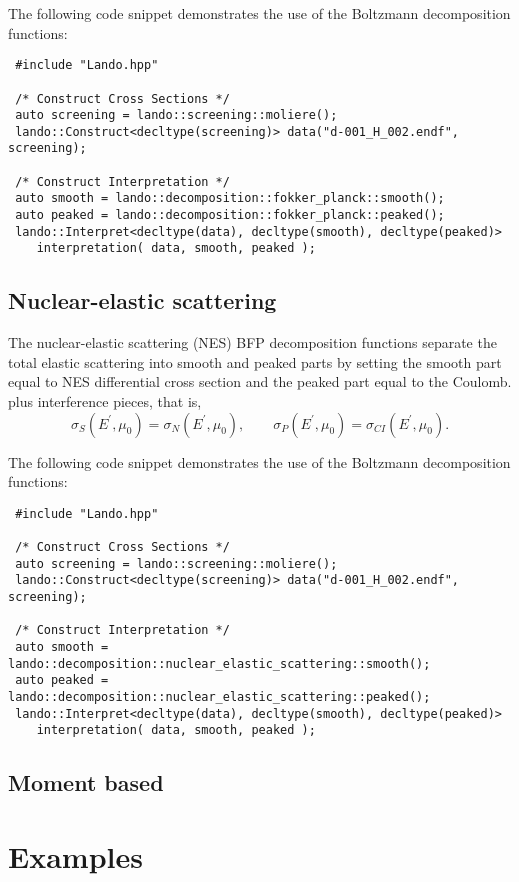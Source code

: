 \documentclass[../main.tex]{subfiles}
\begin{document}
The following code snippet demonstrates the use of the Boltzmann decomposition functions:
\begin{verbatim}
 #include "Lando.hpp"

 /* Construct Cross Sections */
 auto screening = lando::screening::moliere();
 lando::Construct<decltype(screening)> data("d-001_H_002.endf", screening);
 
 /* Construct Interpretation */
 auto smooth = lando::decomposition::fokker_planck::smooth();
 auto peaked = lando::decomposition::fokker_planck::peaked();
 lando::Interpret<decltype(data), decltype(smooth), decltype(peaked)> 
    interpretation( data, smooth, peaked );
\end{verbatim}

\subsection{Nuclear-elastic scattering}
The nuclear-elastic scattering (NES) BFP decomposition functions separate the total elastic scattering into smooth and peaked parts by setting the smooth part equal to NES differential cross section and the peaked part equal to the Coulomb. plus interference pieces, that is,
\begin{equation}
    \sigma_S(E^{\prime},\mu_0) = \sigma_{N}(E^{\prime},\mu_0), \quad \quad \sigma_P(E^{\prime},\mu_0) = \sigma_{CI}(E^{\prime},\mu_0).
\end{equation}

The following code snippet demonstrates the use of the Boltzmann decomposition functions:
\begin{verbatim}
 #include "Lando.hpp"

 /* Construct Cross Sections */
 auto screening = lando::screening::moliere();
 lando::Construct<decltype(screening)> data("d-001_H_002.endf", screening);
 
 /* Construct Interpretation */
 auto smooth = lando::decomposition::nuclear_elastic_scattering::smooth();
 auto peaked = lando::decomposition::nuclear_elastic_scattering::peaked();
 lando::Interpret<decltype(data), decltype(smooth), decltype(peaked)> 
    interpretation( data, smooth, peaked );
\end{verbatim}

\subsection{Moment based}

\section{Examples}
\end{document}
